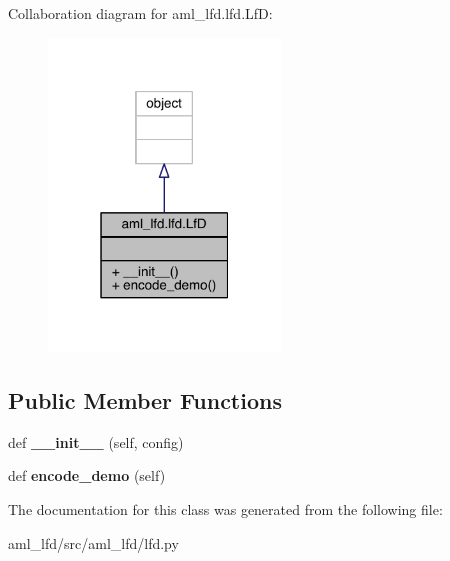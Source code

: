 Collaboration diagram for aml\+\_\+lfd.\+lfd.\+LfD\+:\nopagebreak
\begin{figure}[H]
\begin{center}
\leavevmode
\includegraphics[width=175pt]{classaml__lfd_1_1lfd_1_1_lf_d__coll__graph}
\end{center}
\end{figure}
\subsection*{Public Member Functions}
\begin{DoxyCompactItemize}
\item 
\hypertarget{classaml__lfd_1_1lfd_1_1_lf_d_a384316686def5bc48c6ae934f812df46}{}\label{classaml__lfd_1_1lfd_1_1_lf_d_a384316686def5bc48c6ae934f812df46} 
def {\bfseries \+\_\+\+\_\+init\+\_\+\+\_\+} (self, config)
\item 
\hypertarget{classaml__lfd_1_1lfd_1_1_lf_d_a76c5cceb9412ea16e6dbad821d6836aa}{}\label{classaml__lfd_1_1lfd_1_1_lf_d_a76c5cceb9412ea16e6dbad821d6836aa} 
def {\bfseries encode\+\_\+demo} (self)
\end{DoxyCompactItemize}


The documentation for this class was generated from the following file\+:\begin{DoxyCompactItemize}
\item 
aml\+\_\+lfd/src/aml\+\_\+lfd/lfd.\+py\end{DoxyCompactItemize}
